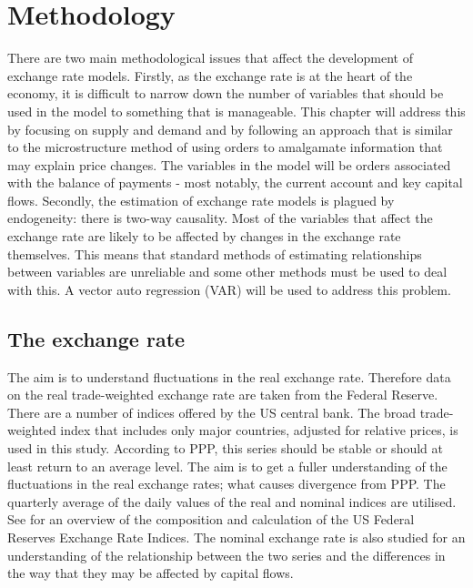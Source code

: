 \documentclass[12pt, a4paper, oneside]{article}\usepackage[]{graphicx}\usepackage[]{color}
\begin{document}
\newpage

\section{Methodology}
There are two %
main methodological issues that affect the development of exchange rate models.  Firstly, as the exchange rate is at the heart of the economy, it is difficult to narrow down the number of variables that should be used in the model to something that is manageable.   This chapter will address this by focusing on supply and demand and by following an approach that is similar to the microstructure method of  using orders to amalgamate information that may explain price changes.   The variables in the model will be orders associated with the balance of payments - most notably, the current account and key capital flows.  Secondly, the estimation of exchange rate models is plagued by endogeneity: there is two-way causality.  Most of the variables that affect the exchange rate are likely to be affected by changes in the exchange rate themselves.  This means that standard methods of estimating relationships between variables are unreliable and some other methods must be used to deal with this.  A vector auto regression (VAR) will be used to address this problem.   

\subsection{The exchange rate}
The aim is to understand fluctuations in the real exchange rate.  Therefore data on the real trade-weighted exchange rate are  taken from the Federal Reserve.  There are a number of indices offered by the US central bank.  The broad trade-weighted index that includes only major countries, adjusted for relative prices, is used in this study.   According to PPP, this series should be stable or should at least return to an average level.  The aim is to get a fuller understanding of the fluctuations in the real exchange rates; what causes divergence from PPP.  The quarterly average of the daily values of the real and nominal indices are utilised.  See \citep{Fedtwi} for an overview of the composition and calculation of the US Federal Reserves Exchange Rate Indices. The nominal exchange rate is also studied for an understanding of the relationship between the two series and the differences in the way that they may be affected by capital flows. 
\end{document}
